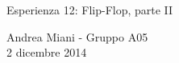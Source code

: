 \documentclass[11pt, twoside, a4paper]{article}
\begin{document}
  \begin{center}
  
    {\huge Esperienza 12: Flip-Flop, parte II}
    
    \vspace{0.1cm}
    
    {Andrea Miani - Gruppo A05} \\
    {2 dicembre 2014}
    
    \vspace{-0.1cm}
    
  \end{center}
  
  
  
  
  
\end{document}
